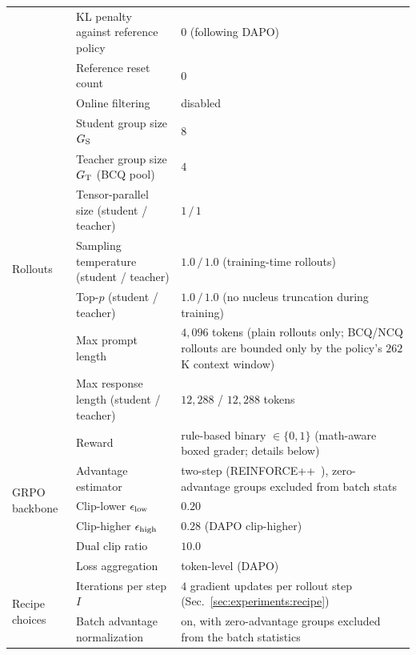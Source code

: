 \begin{table}[!htbp]
{\begin{tabular}{lll}
            & KL penalty against reference policy         & $0$ (following DAPO) \\
            & Reference reset count                       & $0$ \\
            & Online filtering                            & disabled \\
        \midrule
        \multirow{7}{*}{Rollouts}
            & Student group size $G_{\rm S}$              & $8$ \\
            & Teacher group size $G_{\rm T}$ (BCQ pool)   & $4$ \\
            & Tensor-parallel size (student / teacher)    & $1\,/\,1$ \\
            & Sampling temperature (student / teacher)    & $1.0\,/\,1.0$ (training-time rollouts) \\
            & Top-$p$ (student / teacher)                 & $1.0\,/\,1.0$ (no nucleus truncation during training) \\
            & Max prompt length                           & $4{,}096$ tokens (plain rollouts only; BCQ/NCQ rollouts are bounded only by the policy's $262$K context window) \\
            & Max response length (student / teacher)     & $12{,}288$ / $12{,}288$ tokens \\
        \midrule
        \multirow{6}{*}{GRPO backbone}
            & Reward                                      & rule-based binary $\in\{0,1\}$ (math-aware boxed grader; details below) \\
            & Advantage estimator                         & two-step (REINFORCE++~\citep{hu2025reinforce++}), zero-advantage groups excluded from batch stats \\
            & Clip-lower $\epsilon_{\rm low}$             & $0.20$ \\
            & Clip-higher $\epsilon_{\rm high}$           & $0.28$ (DAPO clip-higher) \\
            & Dual clip ratio                             & $10.0$ \\
            & Loss aggregation                            & token-level (DAPO) \\
        \midrule
        \multirow{2}{*}{Recipe choices}
            & Iterations per step $I$                     & $4$ gradient updates per rollout step (Sec.~\ref{sec:experiments:recipe}) \\
            & Batch advantage normalization               & on, with zero-advantage groups excluded from the batch statistics \\

\end{tabular}}
\end{table}
